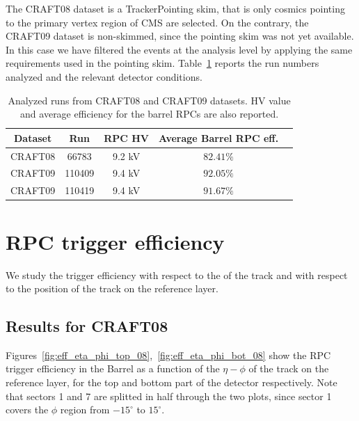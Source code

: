 The CRAFT08 dataset is a TrackerPointing skim, that is 
only cosmics pointing to the primary vertex 
region of CMS are selected. 
On the contrary, the CRAFT09 dataset is non-skimmed, 
since the pointing skim was not yet 
available. In this case we have filtered the 
events at the analysis level by applying the same
requirements used in the pointing skim.
Table~\ref{tab:runs} reports the run numbers analyzed and the 
relevant detector conditions.

 \begin{table}[htb]
    \begin{center}
      \begin{tabular}{|c|c|c|c|c|} \hline
Dataset & Run   & RPC HV & Average Barrel RPC eff.\\ \hline
CRAFT08 & 66783 & 9.2 kV & $82.41\%$ \\ \hline
CRAFT09 & 110409  & 9.4 kV & $92.05\%$ \\ \hline
CRAFT09 & 110419  & 9.4 kV & $91.67\%$ \\ \hline
      \end{tabular}
      \caption{Analyzed runs from CRAFT08 
and CRAFT09 datasets. HV value and average
efficiency for the barrel RPCs are also reported.}
    \label{tab:runs}
    \end{center}
  \end{table}

\section{RPC trigger efficiency}
\label{resultSection}


We study the trigger efficiency with respect to the \pt of the track and 
with respect to the position of the track on the reference layer.

\subsection{Results for CRAFT08}
\label{eff_08}
Figures~\ref{fig:eff_eta_phi_top_08},~\ref{fig:eff_eta_phi_bot_08} show 
the RPC trigger efficiency in the Barrel as a function of the 
$\eta - \phi$ of the track on the reference layer, for the top 
and bottom part of the detector respectively. 
Note that sectors 1 and 7 are splitted in half through the 
two plots, since sector 1 covers the $\phi$
region from $-15^\circ$ to $15^\circ$.

